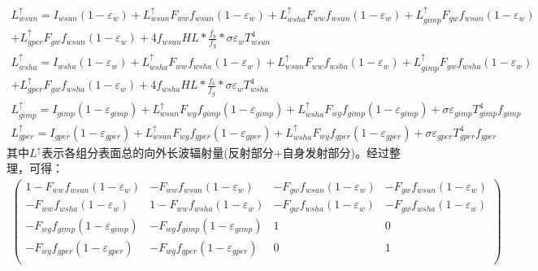 \begin{landscape}
\begin{equation}
    \begin{aligned}
        L_{wsun}^{\uparrow}=I_{wsun}\left(1-\varepsilon_{w}\right)+L_{wsun}^{\uparrow} F_{ww} f_{wsun}\left(1-\varepsilon_{w}\right)+L_{wsha}^{\uparrow} F_{ww} f_{wsun}\left(1-\varepsilon_{w}\right)+L_{gimp}^{\uparrow} F_{g w} f_{wsun}\left(1-\varepsilon_{w}\right)\\+L_{gper}^{\uparrow} F_{g w} f_{wsun}\left(1-\varepsilon_{w}\right)+4 f_{wsun} H L * \frac{f_{b}}{f_{g}} * \sigma \varepsilon_{w} T_{wsun}^{4}\\
        L_{wsha}^{\uparrow}=I_{wsha}\left(1-\varepsilon_{w}\right)+L_{wsha}^{\uparrow} F_{ww} f_{wsha}\left(1-\varepsilon_{w}\right)+L_{wsun}^{\uparrow} F_{ww} f_{wsha}\left(1-\varepsilon_{w}\right)+L_{gimp}^{\uparrow} F_{g w} f_{wsha}\left(1-\varepsilon_{w}\right)\\+L_{gper}^{\uparrow} F_{g w} f_{wsha}\left(1-\varepsilon_{w}\right)+4 f_{wsha} H L * \frac{f_{b}}{f_{g}} * \sigma \varepsilon_{w} T_{wsha}^{4}\\
        L_{gimp}^{\uparrow}=I_{gimp}\left(1-\varepsilon_{gimp}\right)+L_{wsun}^{\uparrow} F_{w g} f_{gimp}\left(1-\varepsilon_{gimp}\right)+L_{wsha}^{\uparrow} F_{w g} f_{gimp}\left(1-\varepsilon_{gimp}\right)+\sigma \varepsilon_{gimp} T_{gimp}^{4} f_{gimp}\\
        L_{gper}^{\uparrow}=I_{gper}\left(1-\varepsilon_{gper}\right)+L_{wsun}^{\uparrow} F_{w g} f_{gper}\left(1-\varepsilon_{gper}\right)+L_{wsha}^{\uparrow} F_{w g} f_{gper}\left(1-\varepsilon_{gper}\right)+\sigma \varepsilon_{gper} T_{gper}^{4} f_{gper}
    \end{aligned}
\end{equation}
其中$L^\uparrow$表示各组分表面总的向外长波辐射量(反射部分+自身发射部分)。经过整理，可得：
\begin{equation}
\begin{aligned}
\left(\begin{matrix}1-F_{ww}f_{wsun}\left(1-\varepsilon_w\right)&-F_{ww}f_{wsun}\left(1-\varepsilon_w\right)&-F_{gw}f_{wsun}\left(1-\varepsilon_w\right)&-F_{gw}f_{wsun}\left(1-\varepsilon_w\right)\\-F_{ww}f_{wsha}\left(1-\varepsilon_w\right)&1-F_{ww}f_{wsha}\left(1-\varepsilon_w\right)&-F_{gw}f_{wsha}\left(1-\varepsilon_w\right)&-F_{gw}f_{wsha}\left(1-\varepsilon_w\right)\\-F_{wg}f_{gimp}\left(1-\varepsilon_{gimp}\right)&-F_{wg}f_{gimp}\left(1-\varepsilon_{gimp}\right)&1&0\\-F_{wg}f_{gper}\left(1-\varepsilon_{gper}\right)&-F_{wg}f_{gper}\left(1-\varepsilon_{gper}\right)&0&1\\\end{matrix}\right)

\end{aligned}
\end{equation}
\end{landscape}
